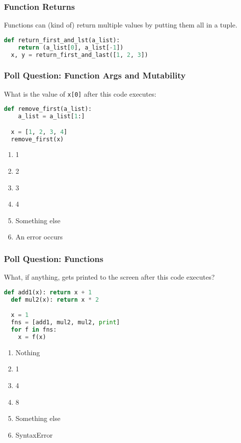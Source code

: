 \documentclass{beamer}
\begin{document}
%
%
\begin{frame}[fragile]
  \frametitle{Function Returns}
  Functions can (kind of) return multiple values by putting them all in a tuple.
  \begin{lstlisting}[language=Python, autogobble]
  def return_first_and_lst(a_list):
    return (a_list[0], a_list[-1])
  x, y = return_first_and_last([1, 2, 3])
  \end{lstlisting}
\end{frame}

%
%
\begin{frame}[fragile]
  \frametitle{Poll Question: Function Args and Mutability}
  What is the value of \lstinline|x[0]| after this code executes:
  \begin{lstlisting}[language=Python, autogobble]
  def remove_first(a_list):
    a_list = a_list[1:]

  x = [1, 2, 3, 4]
  remove_first(x)
  \end{lstlisting}
  \vfill
  \begin{enumerate}[A]
    \item 1
    \item 2
    \item 3
    \item 4
    \item Something else
    \item An error occurs
  \end{enumerate}
\end{frame}

%
%
\begin{frame}[fragile]
  \frametitle{Poll Question: Functions}
  What, if anything, gets printed to the screen after this code executes?
  \begin{lstlisting}[language=Python, autogobble]
  def add1(x): return x + 1
  def mul2(x): return x * 2

  x = 1
  fns = [add1, mul2, mul2, print]
  for f in fns:
    x = f(x)
  \end{lstlisting}
  \vfill
  \begin{enumerate}[A]
    \item Nothing 
    \item 1
    \item 4
    \item 8
    \item Something else
    \item SyntaxError
  \end{enumerate}
\end{frame}
\end{document}
